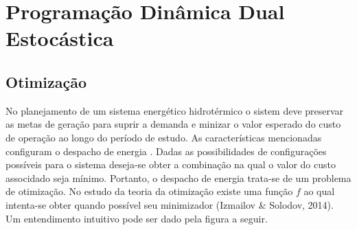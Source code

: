 \documentclass[12pt,fleqn]{article}
\begin{document}
\section{Programa\c c\~ao Din\^amica Dual Estoc\'astica}
\subsection{Otimiza\c c\~ao}
No planejamento de um sistema energ\'etico hidrot\'ermico o sistem deve preservar as metas de gera\c c\~ao para suprir a demanda e minizar o valor esperado do custo de
opera\c c\~ao ao longo do per\'iodo de estudo. As caracter\'isticas mencionadas configuram o despacho de energia
. Dadas as possibilidades de configura\c c\~oes poss\'iveis para o sistema deseja-se obter a combina\c
c\~ao na qual o valor do custo
associdado seja m\'inimo. Portanto, o despacho de energia trata-se de um problema de otimiza\c c\~ao. No estudo da
teoria da otimiza\c c\~ao existe uma fun\c c\~ao $f$ ao qual intenta-se obter
quando poss\'ivel seu minimizador (Izmailov \& Solodov, 2014). Um entendimento intuitivo pode ser dado pela figura a seguir.
\end{document}
